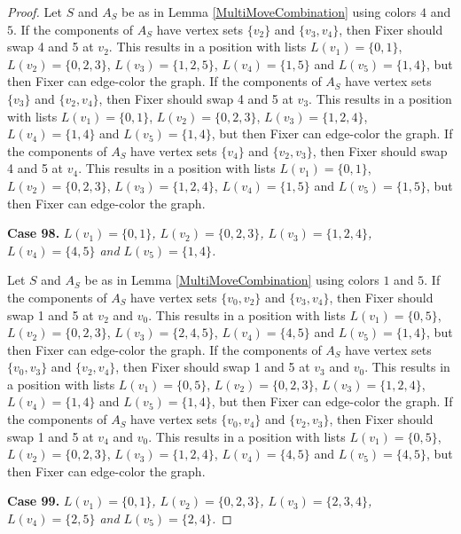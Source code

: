 \documentclass[12pt]{amsart}
\theoremstyle{plain}
\theoremstyle{definition}
\theoremstyle{remark}
\begin{document}
\begin{proof}
Let $S$ and $A_S$ be as in Lemma \ref{MultiMoveCombination} using colors $4$ and $5$. If the components of $A_S$ have vertex sets $\{v_2\}$ and $\{v_3, v_4\}$, then Fixer should swap 4 and 5 at $v_2$. This results in a position with lists $L(v_1) = \{0, 1\}$, $L(v_2) = \{0, 2, 3\}$, $L(v_3) = \{1, 2, 5\}$, $L(v_4) = \{1, 5\}$ and $L(v_5) = \{1, 4\}$, but then Fixer can edge-color the graph.
If the components of $A_S$ have vertex sets $\{v_3\}$ and $\{v_2, v_4\}$, then Fixer should swap 4 and 5 at $v_3$. This results in a position with lists $L(v_1) = \{0, 1\}$, $L(v_2) = \{0, 2, 3\}$, $L(v_3) = \{1, 2, 4\}$, $L(v_4) = \{1, 4\}$ and $L(v_5) = \{1, 4\}$, but then Fixer can edge-color the graph.
If the components of $A_S$ have vertex sets $\{v_4\}$ and $\{v_2, v_3\}$, then Fixer should swap 4 and 5 at $v_4$. This results in a position with lists $L(v_1) = \{0, 1\}$, $L(v_2) = \{0, 2, 3\}$, $L(v_3) = \{1, 2, 4\}$, $L(v_4) = \{1, 5\}$ and $L(v_5) = \{1, 5\}$, but then Fixer can edge-color the graph.

\noindent\textbf{Case 98.  }\textit{$L(v_1) = \{0, 1\}$, $L(v_2) = \{0, 2, 3\}$, $L(v_3) = \{1, 2, 4\}$, $L(v_4) = \{4, 5\}$ and $L(v_5) = \{1, 4\}$.}

Let $S$ and $A_S$ be as in Lemma \ref{MultiMoveCombination} using colors $1$ and $5$. If the components of $A_S$ have vertex sets $\{v_0, v_2\}$ and $\{v_3, v_4\}$, then Fixer should swap 1 and 5 at $v_2$ and $v_0$. This results in a position with lists $L(v_1) = \{0, 5\}$, $L(v_2) = \{0, 2, 3\}$, $L(v_3) = \{2, 4, 5\}$, $L(v_4) = \{4, 5\}$ and $L(v_5) = \{1, 4\}$, but then Fixer can edge-color the graph.
If the components of $A_S$ have vertex sets $\{v_0, v_3\}$ and $\{v_2, v_4\}$, then Fixer should swap 1 and 5 at $v_3$ and $v_0$. This results in a position with lists $L(v_1) = \{0, 5\}$, $L(v_2) = \{0, 2, 3\}$, $L(v_3) = \{1, 2, 4\}$, $L(v_4) = \{1, 4\}$ and $L(v_5) = \{1, 4\}$, but then Fixer can edge-color the graph.
If the components of $A_S$ have vertex sets $\{v_0, v_4\}$ and $\{v_2, v_3\}$, then Fixer should swap 1 and 5 at $v_4$ and $v_0$. This results in a position with lists $L(v_1) = \{0, 5\}$, $L(v_2) = \{0, 2, 3\}$, $L(v_3) = \{1, 2, 4\}$, $L(v_4) = \{4, 5\}$ and $L(v_5) = \{4, 5\}$, but then Fixer can edge-color the graph.

\noindent\textbf{Case 99.  }\textit{$L(v_1) = \{0, 1\}$, $L(v_2) = \{0, 2, 3\}$, $L(v_3) = \{2, 3, 4\}$, $L(v_4) = \{2, 5\}$ and $L(v_5) = \{2, 4\}$.}


\end{proof}
\end{document}
